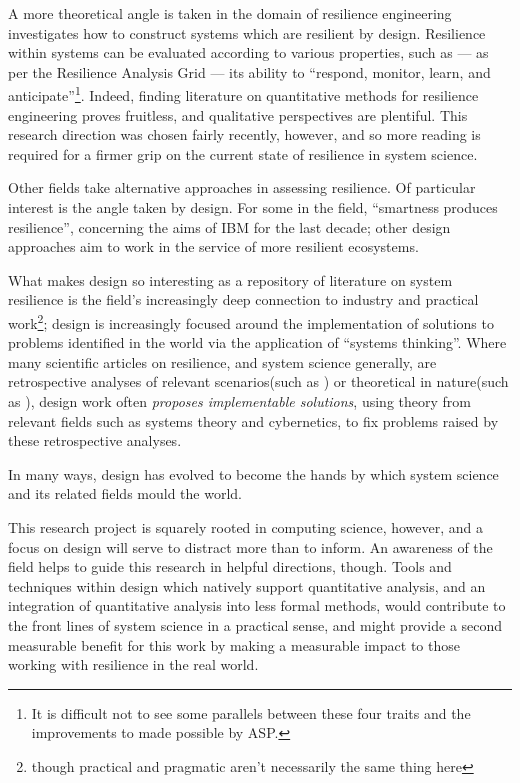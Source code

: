 \documentclass[draft]{article}
\begin{document}
A more theoretical angle is taken in the domain of resilience
engineering\cite{hollnagel_leveson_woods} investigates how to construct systems
which are resilient by design. Resilience within systems can be evaluated
according to various properties, such as --- as per the Resilience Analysis
Grid\cite{hollnagel_RAG} --- its ability to ``respond, monitor, learn, and
anticipate''\footnote{It is difficult not to see some parallels between these
  four traits and the improvements to \pdsf{} made possible by ASP.}. Indeed,
finding literature on quantitative methods for resilience engineering proves
fruitless, and qualitative perspectives are plentiful. This research direction
was chosen fairly recently, however, and so more reading is required for a
firmer grip on the current state of resilience in system science.\par

Other fields take alternative approaches in assessing resilience. Of particular
interest is the angle taken by design. For some in the field, ``smartness
produces resilience''\cite{halpern_grey_room}, concerning the aims of IBM for
the last decade; other design approaches aim to work in the service of more
resilient ecosystems\cite{public_sediment}.\par

What makes design so interesting as a repository of literature on system
resilience is the field's increasingly deep connection to industry and practical
work\footnote{though practical and pragmatic aren't necessarily the same thing
  here}; design is increasingly focused around the implementation of solutions
to problems identified in the world via the application of ``systems thinking''.
Where many scientific articles on resilience, and system science generally, are
retrospective analyses of relevant scenarios(such as \cite{johnson_shea_rail})
or theoretical in nature(such as \cite{statistical_physics_self_replication}),
design work often \emph{proposes implementable solutions}, using theory from
relevant fields such as systems theory and cybernetics, to fix problems raised
by these retrospective analyses.\par

In many ways, design has evolved to become the hands by which system science and
its related fields mould the world.\par

This research project is squarely rooted in computing science, however, and a
focus on design will serve to distract more than to inform. An awareness of the
field helps to guide this research in helpful directions, though. Tools and
techniques within design which natively support quantitative analysis, and an
integration of quantitative analysis into less formal methods, would contribute
to the front lines of system science in a practical sense, and might provide a
second measurable benefit for this work by making a measurable impact to those
working with resilience in the real world.\par
\end{document}
